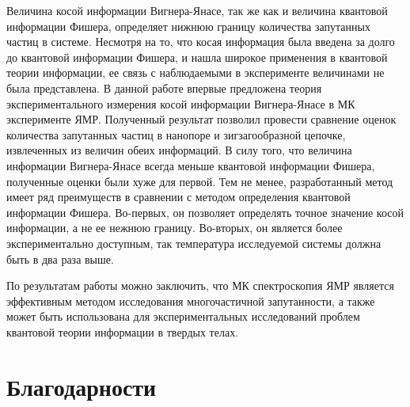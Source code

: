 Величина косой информации Вигнера-Янасе,
так же как и величина квантовой информации Фишера,
определяет нижнюю границу количества запутанных частиц в системе.
Несмотря на то, что косая информация была введена за долго до квантовой информации Фишера,
и нашла широкое применения в квантовой теории информации,
ее связь с наблюдаемыми в эксперименте величинами не была представлена.
В данной работе впервые предложена теория экспериментального измерения косой информации Вигнера-Янасе
в МК эксперименте ЯМР.
Полученный результат позволил провести сравнение оценок количества запутанных частиц в нанопоре и зигзагообразной цепочке,
извлеченных из величин обеих информаций.
В силу того, что величина информации Вигнера-Янасе всегда меньше квантовой информации Фишера,
полученные оценки были хуже для первой.
Тем не менее, разработанный метод имеет ряд преимуществ в сравнении с методом определения квантовой информации Фишера.
Во-первых, он позволяет определять точное значение косой информации, а не ее нежнюю границу.
Во-вторых, он является более экспериментально доступным, так температура исследуемой системы должна быть в два раза выше.


По результатам работы можно заключить,
что МК спектроскопия ЯМР является эффективным методом исследования многочастичной запутанности,
а также может быть использована для экспериментальных исследований проблем квантовой теории информации в твердых телах.

\section*{Благодарности}

